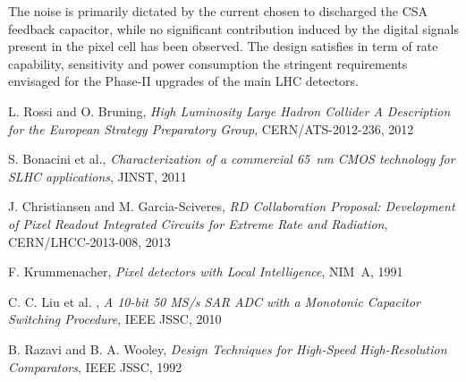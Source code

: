 \documentclass[conference]{./templates/IEEEtran/IEEEtran}
\begin{document}
The noise is primarily dictated by the current chosen to discharged the CSA feedback capacitor, while no significant 
contribution induced by the digital signals present in the pixel cell has been observed. The design satisfies in term 
of rate capability, sensitivity and power consumption the stringent requirements envisaged for the Phase-II upgrades 
of the main LHC detectors.




\vspace*{1cm}



\begin{thebibliography}{10}
\small  %


 L. Rossi and O. Bruning,
                    \emph{High Luminosity Large Hadron Collider A Description for the European Strategy Preparatory Group},
					     CERN/ATS-2012-236, 2012

 S. Bonacini et al.,
                       \emph{Characterization of a commercial 65~nm CMOS technology for SLHC applications},
                       JINST, 2011					

 J. Christiansen and M. Garcia-Sciveres,
                           \emph{RD Collaboration Proposal: Development of Pixel Readout Integrated Circuits for 
						   Extreme Rate and Radiation},
                           CERN/LHCC-2013-008, 2013						   


 F. Krummenacher, 
                           \emph{Pixel detectors with Local Intelligence},
                           NIM~A, 1991 

 C. C. Liu et al. ,
                  \emph{A 10-bit 50 MS/s SAR ADC with a Monotonic Capacitor Switching Procedure},
				  IEEE JSSC, 2010
						   


 B. Razavi and B. A. Wooley,
                     \emph{Design Techniques for High-Speed High-Resolution Comparators},
                     IEEE JSSC, 1992	   
\end{thebibliography}
\end{document}
